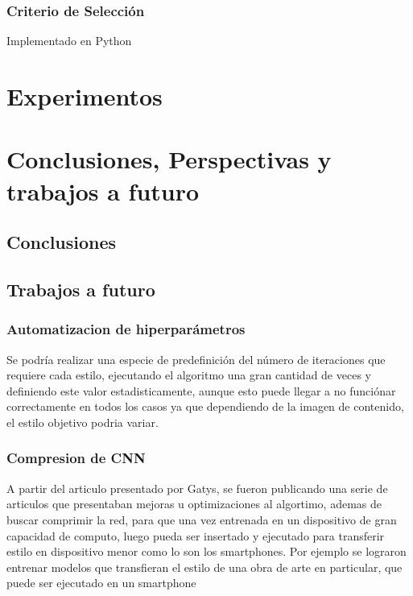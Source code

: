\documentclass[a4paper,11pt,spanish]{book}
\begin{document}
      \subsection{Criterio de Selección}
	Implementado en Python


\chapter{Experimentos}

\chapter{Conclusiones, Perspectivas y trabajos a futuro}
  \section{Conclusiones}
  \section{Trabajos a futuro}
    \subsection{Automatizacion de hiperparámetros}
      Se podría realizar una especie de predefinición del número de iteraciones que requiere cada estilo, ejecutando el algoritmo una gran cantidad de veces y definiendo este valor
      estadisticamente, aunque esto puede llegar a no funciónar correctamente en todos los casos ya que dependiendo de la imagen de contenido, el estilo objetivo podria variar.
    \subsection{Compresion de CNN}
      A partir del articulo presentado por Gatys, se fueron publicando una serie de articulos que presentaban mejoras u optimizaciones al algortimo, ademas de buscar comprimir la red,
      para que una vez entrenada en un dispositivo de gran capacidad de computo, luego pueda ser insertado y ejecutado para transferir estilo en dispositivo menor como lo son los smartphones.
      Por ejemplo se lograron entrenar modelos que transfieran el estilo de una obra de arte en particular, que puede ser ejecutado en un smartphone
\printindex

\end{document}

